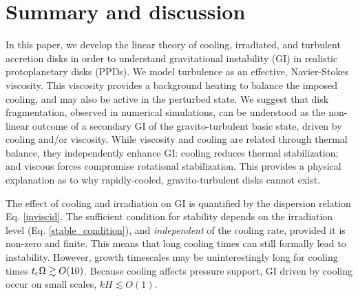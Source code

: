 \section{Summary and discussion}\label{summary}
In this paper, we develop the linear theory of cooling, irradiated,
and turbulent accretion disks in order to understand gravitational
instability (GI) in realistic protoplanetary disks (PPDs). 
We model turbulence as an effective, 
Navier-Stokes viscosity. This viscosity provides a 
background heating to balance the imposed cooling,  
and may also be active in the perturbed state.  
We suggest that disk fragmentation, observed in numerical simulations,
can be understood as the non-linear outcome of a secondary
GI of the gravito-turbulent basic state, driven by cooling and/or viscosity.   
While viscosity and cooling are related through thermal
balance, they independently enhance GI: cooling reduces thermal
stabilization; and viscous forces compromise rotational
stabilization. This provides a physical explanation as to why
rapidly-cooled, gravito-turbulent disks cannot exist. 


The effect of cooling and irradiation on GI is quantified by the
dispersion relation 
Eq. \ref{inviscid}. The sufficient condition for stability 
depends on the irradiation level (Eq. \ref{stable_condition}), and 
\emph{independent} of the cooling rate, provided it is non-zero and
finite. This means that long cooling times can still  
formally lead to instability. However, growth timescales may be 
uninterestingly long for cooling times $t_\mathrm{c}\Omega\gtrsim
O(10)$. Because cooling affects pressure support, GI driven by cooling
occur on small scales, $kH\lesssim O(1)$.   


